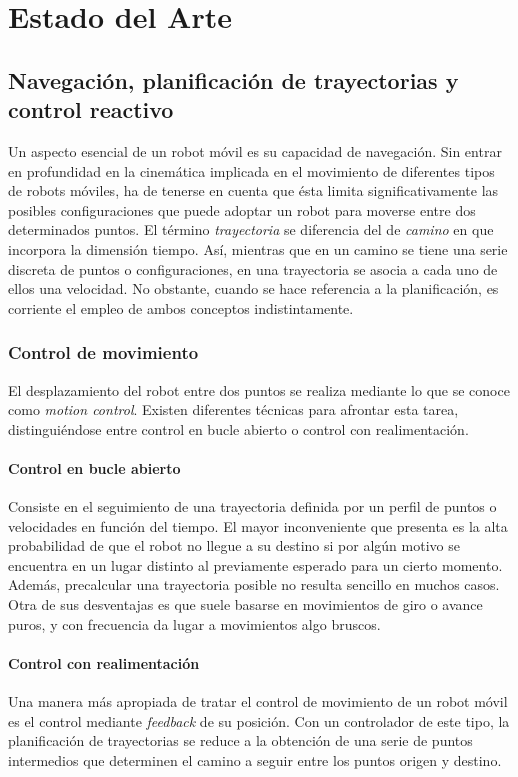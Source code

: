 
\chapter{Estado del Arte}\label{ch:estado}

\section{Navegación, planificación de trayectorias y control reactivo}
Un aspecto esencial de un robot móvil es su capacidad de navegación. Sin entrar en profundidad en la cinemática implicada en el movimiento de diferentes tipos de robots móviles, ha de tenerse en cuenta que ésta limita significativamente las posibles configuraciones que puede adoptar un robot para moverse entre dos determinados puntos. El término \emph{trayectoria} se diferencia del de \emph{camino} en que incorpora la dimensión tiempo. Así, mientras que en un camino se tiene una serie discreta de puntos o configuraciones, en una trayectoria se asocia a cada uno de ellos una velocidad. No obstante, cuando se hace referencia a la planificación, es corriente el empleo de ambos conceptos indistintamente.

\subsection{Control de movimiento}
El desplazamiento del robot entre dos puntos se realiza mediante lo que se conoce como \emph{motion control}. Existen diferentes técnicas para afrontar esta tarea, distinguiéndose entre control en bucle abierto o control con realimentación\cite{Siegwart04}.
\subsubsection{Control en bucle abierto}
Consiste en el seguimiento de una trayectoria definida por un perfil de puntos o velocidades en función del tiempo. El mayor inconveniente que presenta es la alta probabilidad de que el robot no llegue a su destino si por algún motivo se encuentra en un lugar distinto al previamente esperado para un cierto momento. Además, precalcular una trayectoria posible no resulta sencillo en muchos casos. Otra de sus desventajas es que suele basarse en movimientos de giro o avance puros, y con frecuencia da lugar a movimientos algo bruscos.
\subsubsection{Control con realimentación}
Una manera más apropiada de tratar el control de movimiento de un robot móvil es el control mediante \emph{feedback} de su posición. Con un controlador de este tipo, la planificación de trayectorias se reduce a la obtención de una serie de puntos intermedios que determinen el camino a seguir entre los puntos origen y destino.

